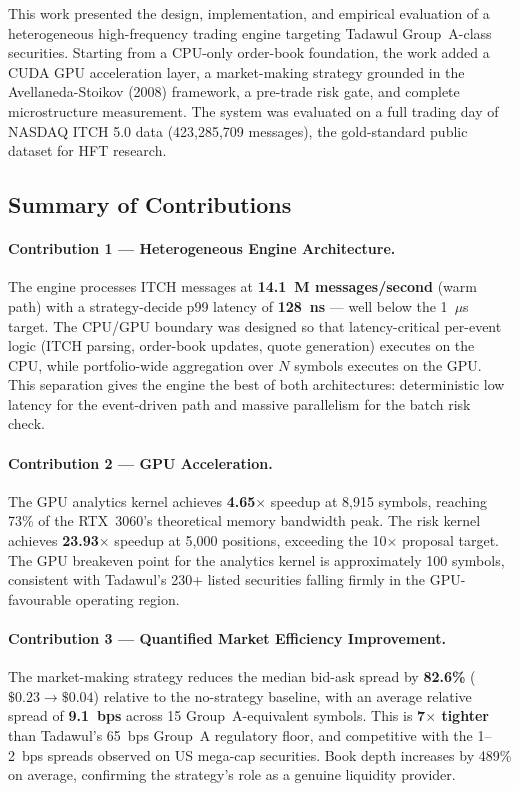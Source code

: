 \documentclass[12pt]{article}
\begin{document}
This work presented the design, implementation, and empirical
evaluation of a heterogeneous high-frequency trading engine targeting
Tadawul Group~A-class securities. Starting from a CPU-only order-book
foundation, the work added a CUDA GPU acceleration layer, a market-making
strategy grounded in the Avellaneda-Stoikov (2008) framework, a
pre-trade risk gate, and complete microstructure measurement. The system
was evaluated on a full trading day of NASDAQ ITCH 5.0 data
(423,285,709 messages), the gold-standard public dataset for HFT
research.

\subsection{Summary of Contributions}
\label{sec:conc:summary}

\paragraph{Contribution 1 — Heterogeneous Engine Architecture.}
The engine processes ITCH messages at \textbf{14.1~M messages/second}
(warm path) with a strategy-decide p99 latency of \textbf{128~ns} ---
well below the 1~$\mu$s target. The CPU/GPU boundary was designed so
that latency-critical per-event logic (ITCH parsing, order-book updates,
quote generation) executes on the CPU, while portfolio-wide aggregation
over $N$ symbols executes on the GPU. This separation gives the engine
the best of both architectures: deterministic low latency for the
event-driven path and massive parallelism for the batch risk check.

\paragraph{Contribution 2 — GPU Acceleration.}
The GPU analytics kernel achieves \textbf{4.65$\times$} speedup at
8,915 symbols, reaching 73\% of the RTX~3060's theoretical memory
bandwidth peak. The risk kernel achieves \textbf{23.93$\times$} speedup
at 5,000 positions, exceeding the 10$\times$ proposal target. The GPU
breakeven point for the analytics kernel is approximately 100 symbols,
consistent with Tadawul's 230+ listed securities falling firmly in
the GPU-favourable operating region.

\paragraph{Contribution 3 — Quantified Market Efficiency Improvement.}
The market-making strategy reduces the median bid-ask spread by
\textbf{82.6\%} ($\$0.23 \to \$0.04$) relative to the no-strategy
baseline, with an average relative spread of \textbf{9.1~bps} across
15 Group~A-equivalent symbols. This is \textbf{7$\times$ tighter} than
Tadawul's 65~bps Group~A regulatory floor, and competitive with the
1--2~bps spreads observed on US mega-cap securities. Book depth
increases by 489\% on average, confirming the strategy's role as a
genuine liquidity provider.
\end{document}
